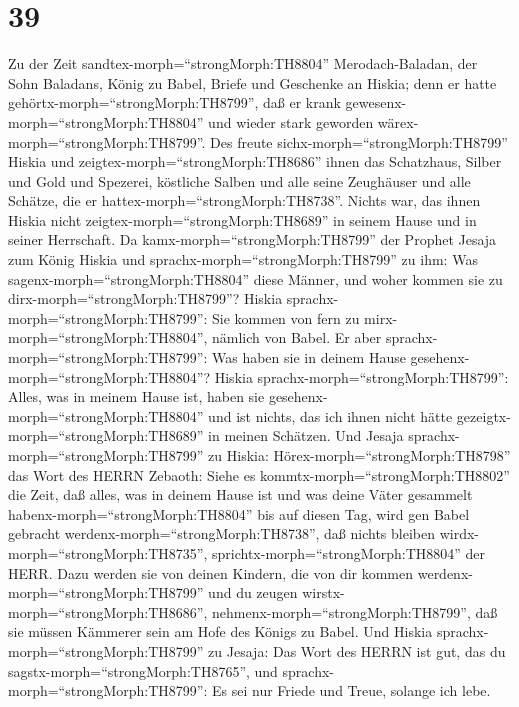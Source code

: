 \hypertarget{section-38}{%
\section{39}\label{section-38}}

 Zu der Zeit sandtex-morph=``strongMorph:TH8804''
Merodach-Baladan, der Sohn Baladans, König zu Babel, Briefe und
Geschenke an Hiskia; denn er hatte gehörtx-morph=``strongMorph:TH8799'',
daß er krank gewesenx-morph=``strongMorph:TH8804'' und wieder stark
geworden wärex-morph=``strongMorph:TH8799''.  Des freute
sichx-morph=``strongMorph:TH8799'' Hiskia und
zeigtex-morph=``strongMorph:TH8686'' ihnen das Schatzhaus, Silber und
Gold und Spezerei, köstliche Salben und alle seine Zeughäuser und alle
Schätze, die er hattex-morph=``strongMorph:TH8738''. Nichts war, das
ihnen Hiskia nicht zeigtex-morph=``strongMorph:TH8689'' in seinem Hause
und in seiner Herrschaft.  Da
kamx-morph=``strongMorph:TH8799'' der Prophet Jesaja zum König Hiskia
und sprachx-morph=``strongMorph:TH8799'' zu ihm: Was
sagenx-morph=``strongMorph:TH8804'' diese Männer, und woher kommen sie
zu dirx-morph=``strongMorph:TH8799''? Hiskia
sprachx-morph=``strongMorph:TH8799'': Sie kommen von fern zu
mirx-morph=``strongMorph:TH8804'', nämlich von Babel.  Er
aber sprachx-morph=``strongMorph:TH8799'': Was haben sie in deinem Hause
gesehenx-morph=``strongMorph:TH8804''? Hiskia
sprachx-morph=``strongMorph:TH8799'': Alles, was in meinem Hause ist,
haben sie gesehenx-morph=``strongMorph:TH8804'' und ist nichts, das ich
ihnen nicht hätte gezeigtx-morph=``strongMorph:TH8689'' in meinen
Schätzen.  Und Jesaja sprachx-morph=``strongMorph:TH8799''
zu Hiskia: Hörex-morph=``strongMorph:TH8798'' das Wort des HERRN
Zebaoth:  Siehe es kommtx-morph=``strongMorph:TH8802'' die
Zeit, daß alles, was in deinem Hause ist und was deine Väter gesammelt
habenx-morph=``strongMorph:TH8804'' bis auf diesen Tag, wird gen Babel
gebracht werdenx-morph=``strongMorph:TH8738'', daß nichts bleiben
wirdx-morph=``strongMorph:TH8735'',
sprichtx-morph=``strongMorph:TH8804'' der HERR.  Dazu werden
sie von deinen Kindern, die von dir kommen
werdenx-morph=``strongMorph:TH8799'' und du zeugen
wirstx-morph=``strongMorph:TH8686'',
nehmenx-morph=``strongMorph:TH8799'', daß sie müssen Kämmerer sein am
Hofe des Königs zu Babel.  Und Hiskia
sprachx-morph=``strongMorph:TH8799'' zu Jesaja: Das Wort des HERRN ist
gut, das du sagstx-morph=``strongMorph:TH8765'', und
sprachx-morph=``strongMorph:TH8799'': Es sei nur Friede und Treue,
solange ich lebe.

